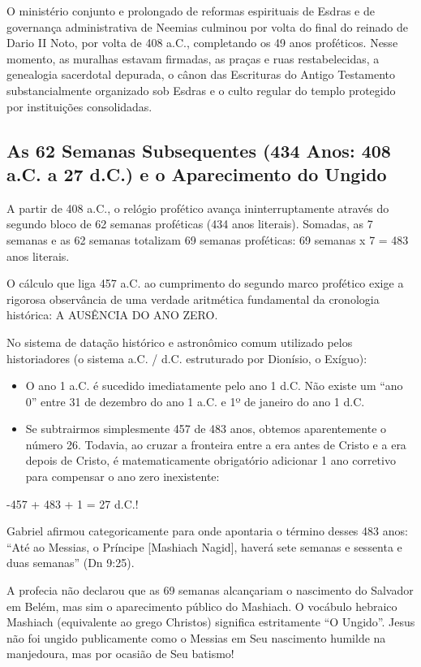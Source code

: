 O ministério conjunto e prolongado de reformas espirituais de Esdras e de governança administrativa de Neemias culminou por volta do final do reinado de Dario II Noto, por volta de 408 a.C., completando os 49 anos proféticos. Nesse momento, as muralhas estavam firmadas, as praças e ruas restabelecidas, a genealogia sacerdotal depurada, o cânon das Escrituras do Antigo Testamento substancialmente organizado sob Esdras e o culto regular do templo protegido por instituições consolidadas.



\subsection{As 62 Semanas Subsequentes (434 Anos: 408 a.C. a 27 d.C.) e o Aparecimento do Ungido}


A partir de 408 a.C., o relógio profético avança ininterruptamente através do segundo bloco de 62 semanas proféticas (434 anos literais). Somadas, as 7 semanas e as 62 semanas totalizam 69 semanas proféticas:
69 semanas x 7 = 483 anos literais.

O cálculo que liga 457 a.C. ao cumprimento do segundo marco profético exige a rigorosa observância de uma verdade aritmética fundamental da cronologia histórica: A AUSÊNCIA DO ANO ZERO.

No sistema de datação histórico e astronômico comum utilizado pelos historiadores (o sistema a.C. / d.C. estruturado por Dionísio, o Exíguo):
\begin{itemize}
  \item O ano 1 a.C. é sucedido imediatamente pelo ano 1 d.C. Não existe um ``ano 0'' entre 31 de dezembro do ano 1 a.C. e 1º de janeiro do ano 1 d.C.
  \item Se subtrairmos simplesmente 457 de 483 anos, obtemos aparentemente o número 26. Todavia, ao cruzar a fronteira entre a era antes de Cristo e a era depois de Cristo, é matematicamente obrigatório adicionar 1 ano corretivo para compensar o ano zero inexistente:
\end{itemize}

-457 + 483 + 1 = 27 d.C.!

Gabriel afirmou categoricamente para onde apontaria o término desses 483 anos:
``Até ao Messias, o Príncipe [Mashiach Nagid], haverá sete semanas e sessenta e duas semanas'' (Dn 9:25).

A profecia não declarou que as 69 semanas alcançariam o nascimento do Salvador em Belém, mas sim o aparecimento público do Mashiach. O vocábulo hebraico Mashiach (equivalente ao grego Christos) significa estritamente ``O Ungido''. Jesus não foi ungido publicamente como o Messias em Seu nascimento humilde na manjedoura, mas por ocasião de Seu batismo!



